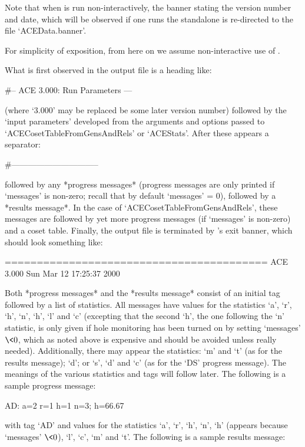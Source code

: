 Note that when {\ACE} is run non-interactively, the banner stating the
version number and date, which  will  be  observed  if  one  runs  the
standalone is re-directed to the file `ACEData.banner'.

For simplicity of exposition, from here on we  assume  non-interactive
use of {\ACE}.

What is first observed in the {\ACE} output file is a heading like:

\begintt
  #-- ACE 3.000: Run Parameters ---
\endtt

(where `3.000' may be replaced be some later version number)  followed
by the \lq{}input parameters' developed from the arguments and options
passed to `ACECosetTableFromGensAndRels' or  `ACEStats'.  After  these
appears a separator:

\begintt
  #--------------------------------
\endtt

followed by  any  *progress  messages*  (progress  messages  are  only
printed if `messages' is non-zero; recall that by default `messages' =
0),   followed   by   a   *results   message*.   In   the   case    of
`ACECosetTableFromGensAndRels', these messages  are  followed  by  yet
more progress messages (if `messages' is non-zero) and a coset  table.
Finally, the {\ACE} output file is terminated by {\ACE}'s exit banner,
which should look something like:

\begintt
=========================================
ACE 3.000        Sun Mar 12 17:25:37 2000
\endtt

Both *progress messages* and  the  *results  message*  consist  of  an
initial tag followed by a list of statistics. All messages have values
for the statistics `a', `r', `h', `n', `h',  `l'  and  `c'  (excepting
that the second `h', the one following  the  `n'  statistic,  is  only
given if hole monitoring has been turned on by setting `messages'  $\<
0$, which as noted above is expensive and  should  be  avoided  unless
really needed). Additionally, there may appear the statistics: `m' and
`t' (as for the results message); `d'; or `s', `d' and `c' (as for the
`DS' progress message). The meanings of  the  various  statistics  and
tags will follow later. The following is a sample progress message:

\begintt
AD: a=2 r=1 h=1 n=3; h=66.67%
\endtt

with tag `AD' and values for the statistics `a', `r',  `h',  `n',  `h'
(appears because `messages' $\<  0$),  `l',  `c',  `m'  and  `t'.  The
following is a sample results message:

